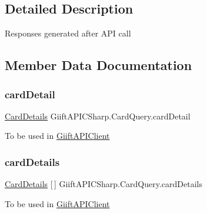 \subsection{Detailed Description}
Responses generated after A\+PI call 



\subsection{Member Data Documentation}
\mbox{\label{class_giift_a_p_i_c_sharp_1_1_card_query_ab7d73191cdb237861104070264541d99}} 
\subsubsection{\texorpdfstring{card\+Detail}{cardDetail}}
{\footnotesize\ttfamily \hyperlink{class_giift_a_p_i_c_sharp_1_1_card_details}{Card\+Details} Giift\+A\+P\+I\+C\+Sharp.\+Card\+Query.\+card\+Detail}



To be used in \hyperlink{class_giift_a_p_i_c_sharp_1_1_giift_a_p_i_client}{Giift\+A\+P\+I\+Client} 

\mbox{\label{class_giift_a_p_i_c_sharp_1_1_card_query_abf95fbe5a9f55425cbcec565bfff59ed}} 
\subsubsection{\texorpdfstring{card\+Details}{cardDetails}}
{\footnotesize\ttfamily \hyperlink{class_giift_a_p_i_c_sharp_1_1_card_details}{Card\+Details} \mbox{[}$\,$\mbox{]} Giift\+A\+P\+I\+C\+Sharp.\+Card\+Query.\+card\+Details}



To be used in \hyperlink{class_giift_a_p_i_c_sharp_1_1_giift_a_p_i_client}{Giift\+A\+P\+I\+Client} 



